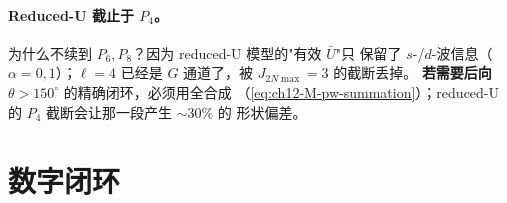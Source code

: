\paragraph{Reduced-U 截止于 \(P_4\)。}
为什么不续到 \(P_6, P_8\)？因为 reduced-U 模型的"有效 \(\bar U\)"只
保留了 \(s\)-/\(d\)-波信息（\(\alpha = 0, 1\)）；\(\ell = 4\) 已经是
\(G\) 通道了，被 \(J_{2N\max} = 3\) 的截断丢掉。
\textbf{若需要后向 \(\theta > 150^\circ\)} 的精确闭环，必须用全合成
（\cref{eq:ch12-M-pw-summation}）；reduced-U 的 \(P_4\) 截断会让那一段产生 \(\sim 30\%\) 的
形状偏差。

\section{数字闭环}
\label{sec:ch12-numerics}

